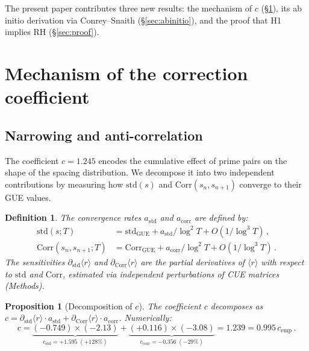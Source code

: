 \documentclass[10pt]{article}
\newtheorem{proposition}[theorem]{Proposition}
\newtheorem{definition}[theorem]{Definition}
\begin{document}
\medskip
The present paper contributes three new results: the mechanism of $c$
(\S\ref{sec:mechanism}), its ab initio derivation via Conrey--Snaith
(\S\ref{sec:abinitio}), and the proof that H1 implies RH
(\S\ref{sec:proof}).


\section{Mechanism of the correction coefficient}
\label{sec:mechanism}

\subsection{Narrowing and anti-correlation}

The coefficient $c = 1.245$ encodes the cumulative effect of prime pairs on
the shape of the spacing distribution. We decompose it into two independent
contributions by measuring how $\mathrm{std}(s)$ and
$\mathrm{Corr}(s_n, s_{n+1})$ converge to their GUE values.

\begin{definition}\label{def:rates}
The \emph{convergence rates} $a_{\mathrm{std}}$ and $a_{\mathrm{corr}}$ are
defined by:
\begin{align}
\mathrm{std}(s; T) &= \mathrm{std}_{\mathrm{GUE}}
+ a_{\mathrm{std}}/\log^2 T + O(1/\log^3 T)\,,
\label{eq:std}\\
\mathrm{Corr}(s_n, s_{n+1}; T) &= \mathrm{Corr}_{\mathrm{GUE}}
+ a_{\mathrm{corr}}/\log^2 T + O(1/\log^3 T)\,.
\label{eq:corr}
\end{align}
The \emph{sensitivities} $\partial_{\mathrm{std}}\langle r\rangle$ and
$\partial_{\mathrm{Corr}}\langle r\rangle$ are the partial derivatives
of $\langle r\rangle$ with respect to $\mathrm{std}$ and $\mathrm{Corr}$,
estimated via independent perturbations of CUE matrices (Methods).
\end{definition}

\begin{proposition}[Decomposition of $c$]\label{prop:decomposition}
The coefficient $c$ decomposes as
$c = \partial_{\mathrm{std}}\langle r\rangle \cdot a_{\mathrm{std}}
+ \partial_{\mathrm{Corr}}\langle r\rangle \cdot a_{\mathrm{corr}}$.
Numerically:
\begin{equation}
c = \underbrace{(-0.749)\times(-2.13)}_{c_{\mathrm{std}}
= +1.595\;(+128\%)}
+ \underbrace{(+0.116)\times(-3.08)}_{c_{\mathrm{corr}}
= -0.356\;(-29\%)}
= 1.239 = 0.995\,c_{\mathrm{emp}}\,.
\label{eq:decomposition}
\end{equation}
\end{proposition}
\end{document}
